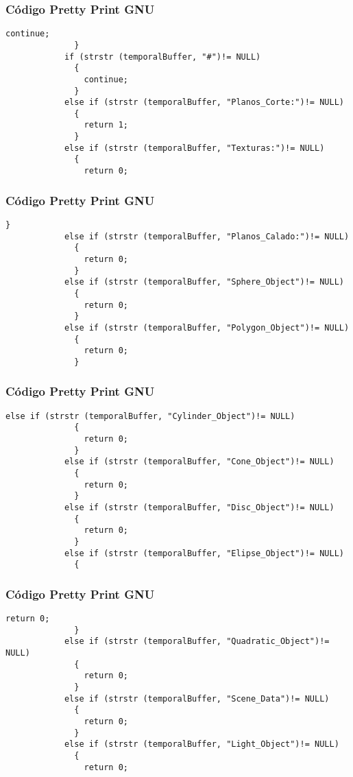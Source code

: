 \documentclass{beamer}
\begin{document}
\begin{frame}[fragile]
\frametitle{C\'odigo Pretty Print GNU}
\begin{lstlisting}[style=CStyle]
                continue;
              }
            if (strstr (temporalBuffer, "#")!= NULL)
              {
                continue;
              }
            else if (strstr (temporalBuffer, "Planos_Corte:")!= NULL)
              {
                return 1;
              }
            else if (strstr (temporalBuffer, "Texturas:")!= NULL)
              {
                return 0;
\end{lstlisting}
\end{frame}
\begin{frame}[fragile]
\frametitle{C\'odigo Pretty Print GNU}
\begin{lstlisting}[style=CStyle]
              }
            else if (strstr (temporalBuffer, "Planos_Calado:")!= NULL)
              {
                return 0;
              }
            else if (strstr (temporalBuffer, "Sphere_Object")!= NULL)
              {
                return 0;
              }
            else if (strstr (temporalBuffer, "Polygon_Object")!= NULL)
              {
                return 0;
              }
\end{lstlisting}
\end{frame}
\begin{frame}[fragile]
\frametitle{C\'odigo Pretty Print GNU}
\begin{lstlisting}[style=CStyle]
            else if (strstr (temporalBuffer, "Cylinder_Object")!= NULL)
              {
                return 0;
              }
            else if (strstr (temporalBuffer, "Cone_Object")!= NULL)
              {
                return 0;
              }
            else if (strstr (temporalBuffer, "Disc_Object")!= NULL)
              {
                return 0;
              }
            else if (strstr (temporalBuffer, "Elipse_Object")!= NULL)
              {
                \end{lstlisting}
\end{frame}
\begin{frame}[fragile]
\frametitle{C\'odigo Pretty Print GNU}
\begin{lstlisting}[style=CStyle]
                return 0;
              }
            else if (strstr (temporalBuffer, "Quadratic_Object")!= NULL)
              {
                return 0;
              }
            else if (strstr (temporalBuffer, "Scene_Data")!= NULL)
              {
                return 0;
              }
            else if (strstr (temporalBuffer, "Light_Object")!= NULL)
              {
                return 0;
\end{lstlisting}
\end{frame}
\end{document}
